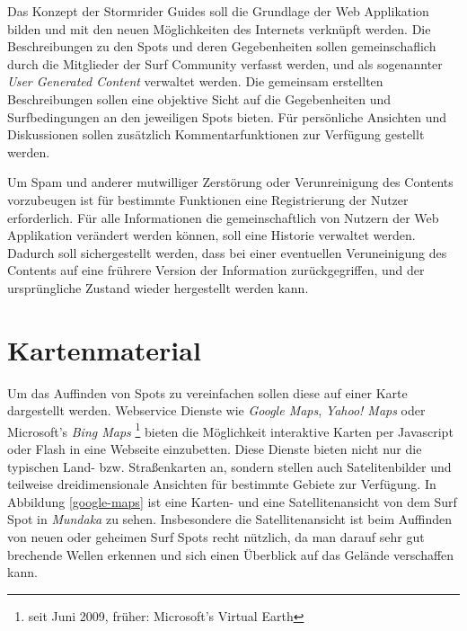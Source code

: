 Das Konzept der Stormrider Guides soll die Grundlage der Web
Applikation bilden und mit den neuen Möglichkeiten des Internets
verknüpft werden. Die Beschreibungen zu den Spots und deren
Gegebenheiten sollen gemeinschaflich durch die Mitglieder der Surf
Community verfasst werden, und als sogenannter \textit{User Generated
  Content} verwaltet werden. Die gemeinsam erstellten Beschreibungen
sollen eine objektive Sicht auf die Gegebenheiten und Surfbedingungen
an den jeweiligen Spots bieten. Für persönliche Ansichten und
Diskussionen sollen zusätzlich Kommentarfunktionen zur Verfügung
gestellt werden.

Um Spam und anderer mutwilliger Zerstörung oder Verunreinigung des
Contents vorzubeugen ist für bestimmte Funktionen eine Registrierung
der Nutzer erforderlich. Für alle Informationen die gemeinschaftlich
von Nutzern der Web Applikation verändert werden können, soll eine
Historie verwaltet werden. Dadurch soll sichergestellt werden, dass
bei einer eventuellen Veruneinigung des Contents auf eine frührere
Version der Information zurückgegriffen, und der ursprüngliche Zustand
wieder hergestellt werden kann.

\section{Kartenmaterial}

Um das Auffinden von Spots zu vereinfachen sollen diese auf einer
Karte dargestellt werden. Webservice Dienste wie \textit{Google Maps},
\textit{Yahoo! Maps} oder Microsoft's \textit{Bing Maps}
\footnote{seit Juni 2009, früher: Microsoft's Virtual Earth} bieten
die Möglichkeit interaktive Karten per Java\-script oder Flash in eine
Webseite einzubetten. Diese Dienste bieten nicht nur die typischen
Land- bzw. Straßenkarten an, sondern stellen auch Satelitenbilder und
teilweise dreidimensionale Ansichten für bestimmte Gebiete zur
Verfügung. In Abbildung \ref{google-maps} ist eine Karten- und eine
Satellitenansicht von dem Surf Spot in \textit{Mundaka} zu
sehen. Insbesondere die Satellitenansicht ist beim Auffinden von neuen
oder geheimen Surf Spots recht nützlich, da man darauf sehr gut
brechende Wellen erkennen und sich einen Überblick auf das Gelände
verschaffen kann.


